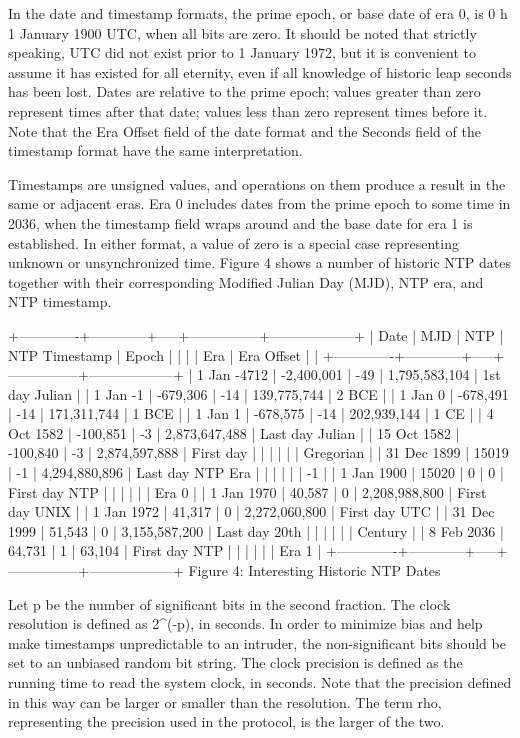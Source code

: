 In the date and timestamp formats, the prime epoch, or base date of
era 0, is 0 h 1 January 1900 UTC, when all bits are zero. It should
be noted that strictly speaking, UTC did not exist prior to 1 January
1972, but it is convenient to assume it has existed for all eternity,
even if all knowledge of historic leap seconds has been lost. Dates
are relative to the prime epoch; values greater than zero represent
times after that date; values less than zero represent times before
it. Note that the Era Offset field of the date format and the
Seconds field of the timestamp format have the same interpretation.

Timestamps are unsigned values, and operations on them produce a
result in the same or adjacent eras. Era 0 includes dates from the
prime epoch to some time in 2036, when the timestamp field wraps
around and the base date for era 1 is established. In either format,
a value of zero is a special case representing unknown or
unsynchronized time. Figure 4 shows a number of historic NTP dates
together with their corresponding Modified Julian Day (MJD), NTP era,
and NTP timestamp.

+-------------+------------+-----+---------------+------------------+
| Date | MJD | NTP | NTP Timestamp | Epoch |
| | | Era | Era Offset | |
+-------------+------------+-----+---------------+------------------+
| 1 Jan -4712 | -2,400,001 | -49 | 1,795,583,104 | 1st day Julian |
| 1 Jan -1 | -679,306 | -14 | 139,775,744 | 2 BCE |
| 1 Jan 0 | -678,491 | -14 | 171,311,744 | 1 BCE |
| 1 Jan 1 | -678,575 | -14 | 202,939,144 | 1 CE |
| 4 Oct 1582 | -100,851 | -3 | 2,873,647,488 | Last day Julian |
| 15 Oct 1582 | -100,840 | -3 | 2,874,597,888 | First day |
| | | | | Gregorian |
| 31 Dec 1899 | 15019 | -1 | 4,294,880,896 | Last day NTP Era |
| | | | | -1 |
| 1 Jan 1900 | 15020 | 0 | 0 | First day NTP |
| | | | | Era 0 |
| 1 Jan 1970 | 40,587 | 0 | 2,208,988,800 | First day UNIX |
| 1 Jan 1972 | 41,317 | 0 | 2,272,060,800 | First day UTC |
| 31 Dec 1999 | 51,543 | 0 | 3,155,587,200 | Last day 20th |
| | | | | Century |
| 8 Feb 2036 | 64,731 | 1 | 63,104 | First day NTP |
| | | | | Era 1 |
+-------------+------------+-----+---------------+------------------+
Figure 4: Interesting Historic NTP Dates

Let p be the number of significant bits in the second fraction. The
clock resolution is defined as 2^(-p), in seconds. In order to
minimize bias and help make timestamps unpredictable to an intruder,
the non-significant bits should be set to an unbiased random bit
string. The clock precision is defined as the running time to read
the system clock, in seconds. Note that the precision defined in
this way can be larger or smaller than the resolution. The term rho,
representing the precision used in the protocol, is the larger of the
two.

